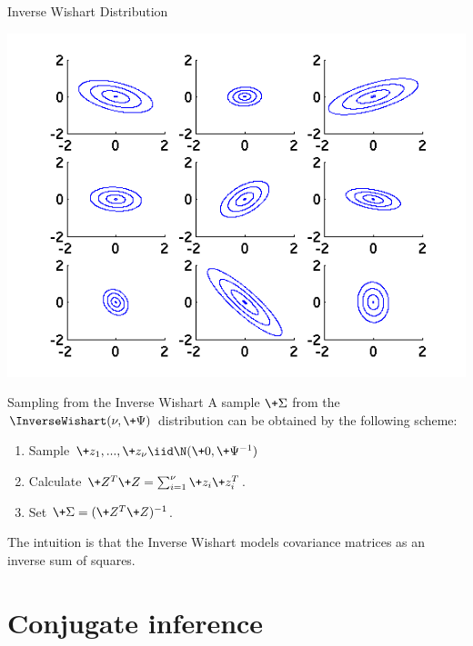 \documentclass[10pt]{beamer}
\begin{document}
\begin{frame}{Inverse Wishart Distribution}

\vfill 
\begin{center}
\includegraphics[width=.7\textwidth]{images/inverse_wishart_samples}
\end{center}
\vfill 
{}

\end{frame}

\begin{frame}{Sampling from the Inverse Wishart}
A sample $\+\Sigma$ from the $\InverseWishart(\nu, \+\Psi)$ distribution  can be obtained by the following scheme:

\begin{enumerate}
\item Sample $\+z_1, ..., \+z_{\nu} \iid \N (\+0,  \+\Psi^{-1})$
\item Calculate $\+Z^T \+Z = \sum_{i=1}^\nu \+z_i \+z_i^T$.
\item Set $\+\Sigma = ( \+Z^T \+Z )^{-1}$.
\end{enumerate}
The intuition is that the Inverse Wishart models covariance matrices as an inverse sum of squares.
\end{frame}

\section{Conjugate inference}
\end{document}

